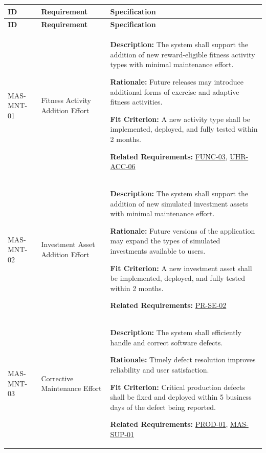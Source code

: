 \documentclass[12pt]{article}
\begin{document}
\small
\setlength{\tabcolsep}{4pt}
\begin{xltabular}{\textwidth}{|p{2.6cm}|p{3.4cm}|X|}
\hline
\textbf{ID} & \textbf{Requirement} & \textbf{Specification} \\
\hline
\endfirsthead
\hline
\textbf{ID} & \textbf{Requirement} & \textbf{Specification} \\
\hline
\endhead

MAS-MNT-01\hypertarget{req:MAS-MNT-01}{} &
Fitness Activity Addition Effort &
\textbf{Description:} The system shall support the addition of new reward-eligible fitness activity types with minimal maintenance effort.

\textbf{Rationale:} Future releases may introduce additional forms of exercise and adaptive fitness activities.

\textbf{Fit Criterion:} A new activity type shall be implemented, deployed, and fully tested within 2 months.

\textbf{Related Requirements:} \hyperlink{req:FUNC-03}{FUNC-03}, \hyperlink{req:UHR-ACC-06}{UHR-ACC-06}\\
\hline

MAS-MNT-02\hypertarget{req:MAS-MNT-02}{} &
Investment Asset Addition Effort &
\textbf{Description:} The system shall support the addition of new simulated investment assets with minimal maintenance effort.

\textbf{Rationale:} Future versions of the application may expand the types of simulated investments available to users.

\textbf{Fit Criterion:} A new investment asset shall be implemented, deployed, and fully tested within 2 months.

\textbf{Related Requirements:} \hyperlink{req:PR-SE-02}{PR-SE-02}\\
\hline

MAS-MNT-03\hypertarget{req:MAS-MNT-03}{} &
Corrective Maintenance Effort &
\textbf{Description:} The system shall efficiently handle and correct software defects.

\textbf{Rationale:} Timely defect resolution improves reliability and user satisfaction.

\textbf{Fit Criterion:} Critical production defects shall be fixed and deployed within 5 business days of the defect being reported.

\textbf{Related Requirements:} \hyperlink{req:PROD-01}{PROD-01}, \hyperlink{req:MAS-SUP-01}{MAS-SUP-01}\\
\hline


\end{xltabular}
\end{document}
